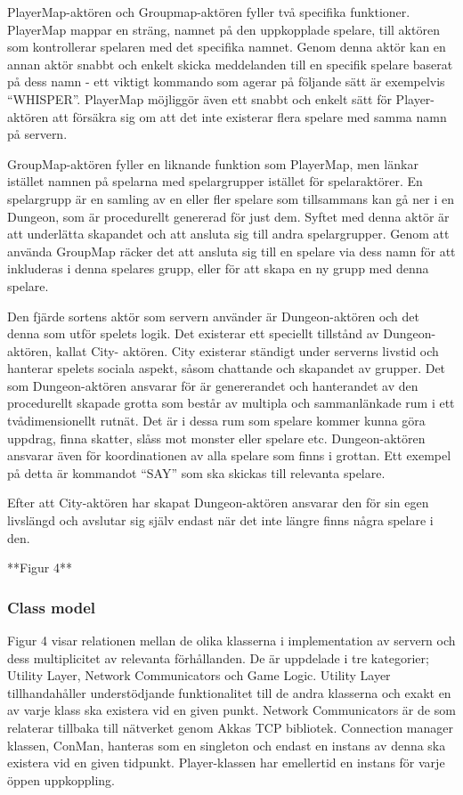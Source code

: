 \documentclass[a4paper]{article}
\begin{document}
PlayerMap-aktören och Groupmap-aktören fyller två specifika funktioner. PlayerMap mappar en sträng, namnet på den uppkopplade spelare, till aktören som kontrollerar 
spelaren med det specifika namnet. Genom denna aktör kan en annan aktör snabbt och enkelt skicka meddelanden till en specifik spelare baserat på dess namn - 
ett viktigt kommando som agerar på följande sätt är exempelvis “WHISPER”. PlayerMap möjliggör även ett snabbt och enkelt sätt för Player-aktören att försäkra 
sig om att det inte existerar flera spelare med samma namn på servern.

GroupMap-aktören fyller en liknande funktion som PlayerMap, men länkar istället namnen på spelarna med spelargrupper istället för spelaraktörer. 
En spelargrupp är en samling av en eller fler spelare som tillsammans kan gå ner i en Dungeon, som är procedurellt genererad för just dem. Syftet med 
denna aktör är att underlätta skapandet och att ansluta sig till andra spelargrupper. Genom att använda GroupMap räcker det att ansluta sig till en 
spelare via dess namn för att inkluderas i denna spelares grupp, eller för att skapa en ny grupp med denna spelare.

Den fjärde sortens aktör som servern använder är Dungeon-aktören och det denna som utför spelets logik. 
Det existerar ett speciellt tillstånd av Dungeon-aktören, kallat City- aktören. City existerar ständigt 
under serverns livstid och hanterar spelets sociala aspekt, såsom chattande och skapandet av grupper. 
Det som Dungeon-aktören ansvarar för är genererandet och hanterandet av den procedurellt skapade 
grotta som består av multipla och sammanlänkade rum i ett tvådimensionellt rutnät. Det är i dessa rum som spelare kommer kunna göra uppdrag, 
finna skatter, slåss mot monster eller spelare etc. Dungeon-aktören ansvarar även för koordinationen av alla spelare som finns i grottan. 
Ett exempel på detta är kommandot “SAY”  som ska skickas till relevanta spelare. 

Efter att City-aktören har skapat Dungeon-aktören ansvarar den för sin egen livslängd och avslutar sig själv endast när det inte längre finns några spelare i den.

**Figur 4**

\subsubsection{Class model}
Figur 4 visar relationen mellan de olika klasserna i implementation av servern och dess multiplicitet av relevanta förhållanden. 
De är uppdelade i tre kategorier; Utility Layer, Network Communicators och Game Logic. 
Utility Layer tillhandahåller understödjande funktionalitet till de andra klasserna och exakt en av varje klass ska existera vid en given punkt. 
Network Communicators är de som relaterar tillbaka till nätverket genom Akkas TCP bibliotek. Connection manager klassen, ConMan, hanteras som en singleton och endast en 
instans av denna ska existera vid en given tidpunkt. Player-klassen har emellertid en instans för varje öppen uppkoppling.
\end{document}
